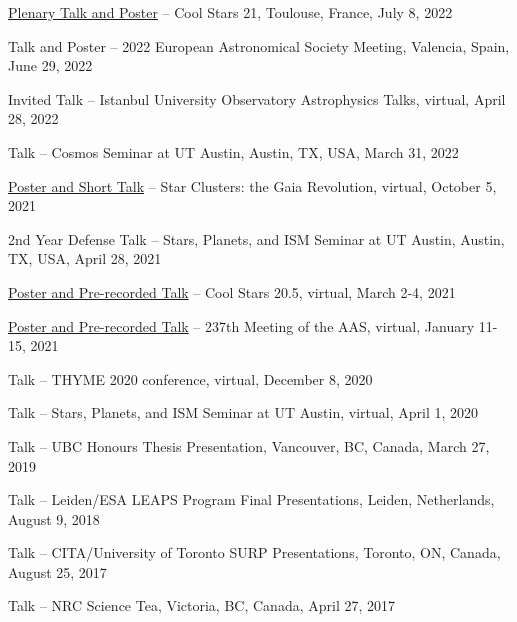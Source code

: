 \documentclass[12pt,a4paper,sans,xetex]{moderncv}        %
\begin{document}
\begin{etaremune}[topsep=0pt,itemsep=0pt,partopsep=0pt,parsep=0pt]
\item \href{https://ui.adsabs.harvard.edu/abs/2022csss.confE..86K/abstract}{Plenary Talk and Poster} -- Cool Stars 21, Toulouse, France, July 8, 2022

\item Talk and Poster -- 2022 European Astronomical Society Meeting, Valencia, Spain, June 29, 2022

\item Invited Talk -- Istanbul University Observatory Astrophysics Talks, virtual, April 28, 2022

\item Talk -- Cosmos Seminar at UT Austin, Austin, TX, USA, March 31, 2022

\item \href{https://ui.adsabs.harvard.edu/abs/2021scgr.confE..11K/abstract}{Poster and Short Talk} -- Star Clusters: the Gaia Revolution, virtual, October 5, 2021

\item 2nd Year Defense Talk -- Stars, Planets, and ISM Seminar at UT Austin, Austin, TX, USA, April 28, 2021

\item \href{https://ui.adsabs.harvard.edu/abs/2021csss.confE.275K/abstract}{Poster and Pre-recorded Talk} -- Cool Stars 20.5, virtual, March 2-4, 2021

\item \href{https://ui.adsabs.harvard.edu/abs/2021AAS...23734812K/abstract}{Poster and Pre-recorded Talk} -- 237th Meeting of the AAS, virtual, January 11-15, 2021

\item Talk -- THYME 2020 conference, virtual, December 8, 2020

\item Talk -- Stars, Planets, and ISM Seminar at UT Austin, virtual, April 1, 2020

\item Talk -- UBC Honours Thesis Presentation, Vancouver, BC, Canada, March 27, 2019

\item Talk -- Leiden/ESA LEAPS Program Final Presentations, Leiden, Netherlands, August 9, 2018

\item Talk -- CITA/University of Toronto SURP Presentations, Toronto, ON, Canada, August 25, 2017

\item Talk -- NRC Science Tea, Victoria, BC, Canada, April 27, 2017

\end{etaremune}
\end{document}
